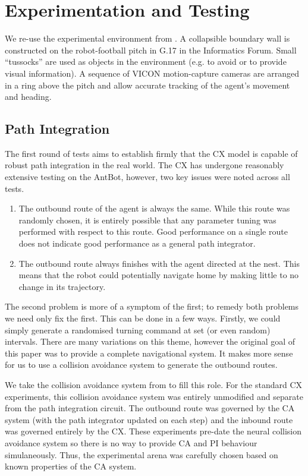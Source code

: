 \documentclass[a4paper,11pt,twoside,openright]{article}
\let\oldsection\section
\def\section{\cleardoublepage\oldsection}
\begin{document}
\section{Experimentation and Testing}\label{sec:test}
We re-use the experimental environment from \cite{Mitchell2018}. A
collapsible boundary wall is constructed on the robot-football pitch
in G.17 in the Informatics Forum. Small ``tussocks'' are used as
objects in the environment (e.g. to avoid or to provide visual
information). A sequence of VICON motion-capture cameras are arranged
in a ring above the pitch and allow accurate tracking of the agent's
movement and heading.

\subsection{Path Integration}
The first round of tests aims to establish firmly that the CX model is capable of
robust path integration in the real world. The CX has undergone reasonably
extensive testing on the AntBot, however, two key issues were noted across all
tests.

\begin{enumerate}
\item{
  The outbound route of the agent is always the same. While this route
  was randomly chosen, it is entirely possible that any parameter tuning was
  performed with respect to this route. Good performance on a single route does
  not indicate good performance as a general path integrator.
}

\item{
  The outbound route always finishes with the agent directed at the nest. This
  means that the robot could potentially navigate home by making little to no
  change in its trajectory.
}
\end{enumerate}

The second problem is more of a symptom of the first; to remedy both problems we
need only fix the first. This can be done in a few ways. Firstly, we could
simply generate a randomised turning command at set (or even random) intervals.
There are many variations on this theme, however the original goal of this paper
was to provide a complete navigational system. It makes more sense for us to use
a collision avoidance system to generate the outbound routes.
\newline\par

We take the collision avoidance system from \cite{Mitchell2018} to fill this
role. For the standard CX experiments, this collision avoidance system was
entirely unmodified and separate from the path integration circuit. The outbound
route was governed by the CA system (with the path integrator updated on each
step) and the inbound route was governed entirely by the CX. These experiments
pre-date the neural collision avoidance system so there is no way to provide
CA and PI behaviour simulaneously. Thus, the experimental arena was carefully
chosen based on known properties of the CA system.
\newline
\par
\end{document}

